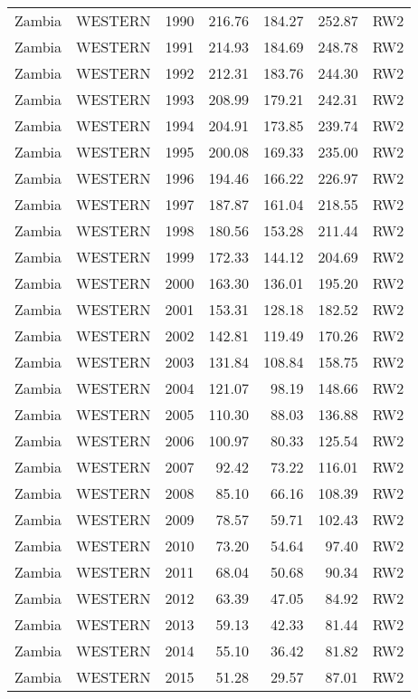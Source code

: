\begin{longtable}{lllrrrl}
  Zambia & WESTERN & 1990 & 216.76 & 184.27 & 252.87 & RW2 \\ 
  Zambia & WESTERN & 1991 & 214.93 & 184.69 & 248.78 & RW2 \\ 
  Zambia & WESTERN & 1992 & 212.31 & 183.76 & 244.30 & RW2 \\ 
  Zambia & WESTERN & 1993 & 208.99 & 179.21 & 242.31 & RW2 \\ 
  Zambia & WESTERN & 1994 & 204.91 & 173.85 & 239.74 & RW2 \\ 
  Zambia & WESTERN & 1995 & 200.08 & 169.33 & 235.00 & RW2 \\ 
  Zambia & WESTERN & 1996 & 194.46 & 166.22 & 226.97 & RW2 \\ 
  Zambia & WESTERN & 1997 & 187.87 & 161.04 & 218.55 & RW2 \\ 
  Zambia & WESTERN & 1998 & 180.56 & 153.28 & 211.44 & RW2 \\ 
  Zambia & WESTERN & 1999 & 172.33 & 144.12 & 204.69 & RW2 \\ 
  Zambia & WESTERN & 2000 & 163.30 & 136.01 & 195.20 & RW2 \\ 
  Zambia & WESTERN & 2001 & 153.31 & 128.18 & 182.52 & RW2 \\ 
  Zambia & WESTERN & 2002 & 142.81 & 119.49 & 170.26 & RW2 \\ 
  Zambia & WESTERN & 2003 & 131.84 & 108.84 & 158.75 & RW2 \\ 
  Zambia & WESTERN & 2004 & 121.07 & 98.19 & 148.66 & RW2 \\ 
  Zambia & WESTERN & 2005 & 110.30 & 88.03 & 136.88 & RW2 \\ 
  Zambia & WESTERN & 2006 & 100.97 & 80.33 & 125.54 & RW2 \\ 
  Zambia & WESTERN & 2007 & 92.42 & 73.22 & 116.01 & RW2 \\ 
  Zambia & WESTERN & 2008 & 85.10 & 66.16 & 108.39 & RW2 \\ 
  Zambia & WESTERN & 2009 & 78.57 & 59.71 & 102.43 & RW2 \\ 
  Zambia & WESTERN & 2010 & 73.20 & 54.64 & 97.40 & RW2 \\ 
  Zambia & WESTERN & 2011 & 68.04 & 50.68 & 90.34 & RW2 \\ 
  Zambia & WESTERN & 2012 & 63.39 & 47.05 & 84.92 & RW2 \\ 
  Zambia & WESTERN & 2013 & 59.13 & 42.33 & 81.44 & RW2 \\ 
  Zambia & WESTERN & 2014 & 55.10 & 36.42 & 81.82 & RW2 \\ 
  Zambia & WESTERN & 2015 & 51.28 & 29.57 & 87.01 & RW2 \\ 

\end{longtable}
